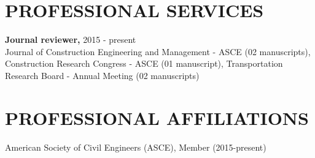 \documentclass[11pt]{res}
\begin{document}
\begin{resume}
\section{PROFESSIONAL SERVICES}
{\bf Journal reviewer,} \hfill 2015 - present\\
Journal of Construction Engineering and Management - ASCE (02 manuscripts), Construction Research Congress - ASCE (01 manuscript), Transportation Research Board - Annual Meeting (02 manuscripts)

\section{PROFESSIONAL AFFILIATIONS}
American Society of Civil Engineers (ASCE), Member (2015-present)
 


\end{resume}
\end{document}
